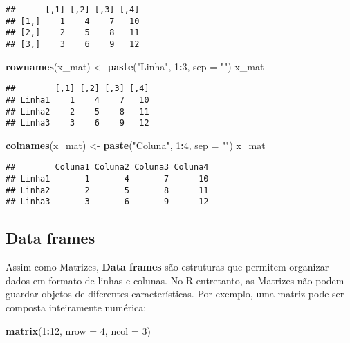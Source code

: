 \documentclass[
]{book}
\newenvironment{Shaded}{\begin{snugshade}}{\end{snugshade}}
\newcommand{\DataTypeTok}[1]{\textcolor[rgb]{0.13,0.29,0.53}{#1}}
\newcommand{\DecValTok}[1]{\textcolor[rgb]{0.00,0.00,0.81}{#1}}
\newcommand{\KeywordTok}[1]{\textcolor[rgb]{0.13,0.29,0.53}{\textbf{#1}}}
\newcommand{\NormalTok}[1]{#1}
\newcommand{\OperatorTok}[1]{\textcolor[rgb]{0.81,0.36,0.00}{\textbf{#1}}}
\newcommand{\StringTok}[1]{\textcolor[rgb]{0.31,0.60,0.02}{#1}}
\begin{document}
\begin{verbatim}
##      [,1] [,2] [,3] [,4]
## [1,]    1    4    7   10
## [2,]    2    5    8   11
## [3,]    3    6    9   12
\end{verbatim}

\begin{Shaded}
\begin{Highlighting}[]
\KeywordTok{rownames}\NormalTok{(x_mat) <-}\StringTok{ }\KeywordTok{paste}\NormalTok{(}\StringTok{"Linha"}\NormalTok{, }\DecValTok{1}\OperatorTok{:}\DecValTok{3}\NormalTok{, }\DataTypeTok{sep =} \StringTok{""}\NormalTok{)}
\NormalTok{x_mat}
\end{Highlighting}
\end{Shaded}

\begin{verbatim}
##        [,1] [,2] [,3] [,4]
## Linha1    1    4    7   10
## Linha2    2    5    8   11
## Linha3    3    6    9   12
\end{verbatim}

\begin{Shaded}
\begin{Highlighting}[]
\KeywordTok{colnames}\NormalTok{(x_mat) <-}\StringTok{ }\KeywordTok{paste}\NormalTok{(}\StringTok{"Coluna"}\NormalTok{, }\DecValTok{1}\OperatorTok{:}\DecValTok{4}\NormalTok{, }\DataTypeTok{sep =} \StringTok{""}\NormalTok{)}
\NormalTok{x_mat}
\end{Highlighting}
\end{Shaded}

\begin{verbatim}
##        Coluna1 Coluna2 Coluna3 Coluna4
## Linha1       1       4       7      10
## Linha2       2       5       8      11
## Linha3       3       6       9      12
\end{verbatim}

\hypertarget{data-frames}{%
\subsection{Data frames}\label{data-frames}}

Assim como Matrizes, \textbf{Data frames} são estruturas que permitem organizar dados em formato de linhas e colunas. No R entretanto, as Matrizes não podem guardar objetos de diferentes características. Por exemplo, uma matriz pode ser composta inteiramente numérica:

\begin{Shaded}
\begin{Highlighting}[]
\KeywordTok{matrix}\NormalTok{(}\DecValTok{1}\OperatorTok{:}\DecValTok{12}\NormalTok{, }\DataTypeTok{nrow =} \DecValTok{4}\NormalTok{, }\DataTypeTok{ncol =} \DecValTok{3}\NormalTok{)}
\end{Highlighting}
\end{Shaded}
\end{document}
